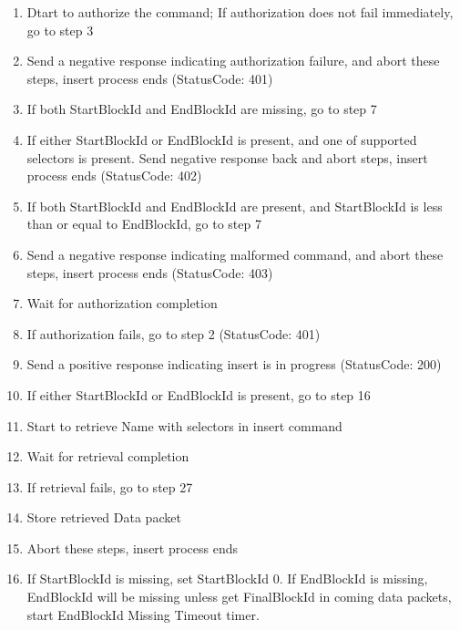 \documentclass{acm_proc_article-sp}
\begin{document}
\begin{enumerate}[step 1]

\item Dtart to authorize the command; If authorization does not fail immediately, go to step 3

\item Send a negative response indicating authorization failure, and abort these steps, insert process ends (StatusCode: 401)

\item If both StartBlockId and EndBlockId are missing, go to step 7

\item If either StartBlockId or EndBlockId is present, and one of supported selectors is present. Send negative response back and abort steps, insert process ends (StatusCode: 402)

\item If both StartBlockId and EndBlockId are present, and StartBlockId is less than or equal to EndBlockId, go to step 7

\item Send a negative response indicating malformed command, and abort these steps, insert process ends (StatusCode: 403)

\item Wait for authorization completion

\item If authorization fails, go to step 2 (StatusCode: 401)

\item Send a positive response indicating insert is in progress (StatusCode: 200)

\item If either StartBlockId or EndBlockId is present, go to step 16

\item Start to retrieve Name with selectors in insert command

\item Wait for retrieval completion

\item If retrieval fails, go to step 27

\item Store retrieved Data packet

\item Abort these steps, insert process ends

\item If StartBlockId is missing, set StartBlockId 0. If EndBlockId is missing, EndBlockId will be missing unless get FinalBlockId in coming data packets, start EndBlockId Missing Timeout timer.


\end{enumerate}
\end{document}
